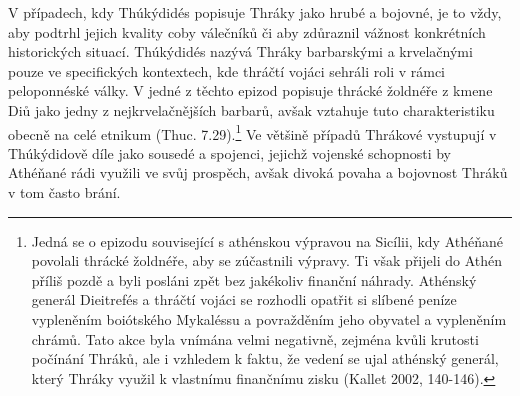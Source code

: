 V případech, kdy Thúkýdidés popisuje Thráky jako hrubé a bojovné, je to vždy, aby podtrhl jejich kvality coby válečníků či aby zdůraznil vážnost konkrétních historických situací. Thúkýdidés nazývá Thráky barbarskými a krvelačnými pouze ve specifických kontextech, kde thráčtí vojáci sehráli roli v rámci peloponnéské války. V jedné z těchto epizod popisuje thrácké žoldnéře z kmene Diů jako jedny z nejkrvelačnějších barbarů, avšak vztahuje tuto charakteristiku obecně na celé etnikum (Thuc. 7.29).\footnote{Jedná se o epizodu související s athénskou výpravou na Sicílii, kdy Athéňané povolali thrácké žoldnéře, aby se zúčastnili výpravy. Ti však přijeli do Athén příliš pozdě a byli posláni zpět bez jakékoliv finanční náhrady. Athénský generál Dieitrefés a thráčtí vojáci se rozhodli opatřit si slíbené peníze vypleněním boiótského Mykaléssu a povražděním jeho obyvatel a vypleněním chrámů. Tato akce byla vnímána velmi negativně, zejména kvůli krutosti počínání Thráků, ale i vzhledem k faktu, že vedení se ujal athénský generál, který Thráky využil k vlastnímu finančnímu zisku (Kallet 2002, 140-146).} Ve většině případů Thrákové vystupují v Thúkýdidově díle jako sousedé a spojenci, jejichž vojenské schopnosti by Athéňané rádi využili ve svůj prospěch, avšak divoká povaha a bojovnost Thráků v tom často brání.

